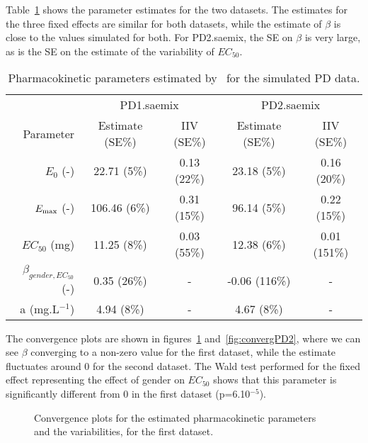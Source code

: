 {Table~\ref{tab:paramPD} shows the parameter estimates for the two datasets. The estimates for the three fixed effects are similar for both datasets, while the estimate of $\beta$ is close to the values simulated for both. For {\sf PD2.saemix}, the SE on $\beta$ is very large, as is the SE on the estimate of the variability of $EC_{50}$.
\begin{table}[!h]
\begin{center}
\begin{tabular}{r c c c c}
\hline
& \multicolumn{2}{c}{PD1.saemix} &\multicolumn{2}{c}{PD2.saemix} \\
Parameter & Estimate (SE\%) & IIV (SE\%)  & Estimate (SE\%) & IIV (SE\%)\\
\hline
$E_{0}$ (-) & 22.71 (5\%) & 0.13 (22\%) & 23.18 (5\%) & 0.16 (20\%)\\
$E_{\rm max}$ (-) & 106.46 (6\%) & 0.31 (15\%) & 96.14 (5\%) & 0.22 (15\%) \\ 
$EC_{50}$ (mg) & 11.25 (8\%) & 0.03 (55\%) & 12.38 (6\%) & 0.01 (151\%)\\
$\beta_{gender,EC_{50}}$ (-) & 0.35 (26\%) & - & -0.06 (116\%) & - \\
a (mg.L$^{-1}$) & 4.94 (8\%) & - & 4.67 (8\%) & - \\
\hline
\end{tabular} 
\caption{Pharmacokinetic parameters estimated by \monolix~for the simulated PD data.} \label{tab:paramPD}
\end{center}
\end{table}

The convergence plots are shown in figures~\ref{fig:convergPD1} and~\ref{fig:convergPD2}, where we can see $\beta$ converging to a non-zero value for the first dataset, while the estimate fluctuates around 0 for the second dataset. The Wald test performed for the fixed effect representing the effect of gender on $EC_{50}$ shows that this parameter is significantly different from 0 in the first dataset (p=6.10$^{-5}$).

\begin{figure}[!h]
\begin{center}
\par \kern -1cm
\end{center}
\par \kern -0.5cm
\caption{Convergence plots for the estimated pharmacokinetic parameters and the variabilities, for the first dataset.} \label{fig:convergPD1}
\end{figure}

}
